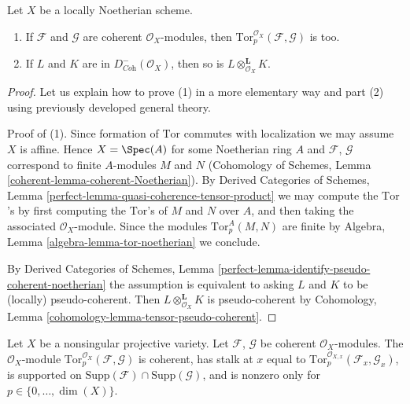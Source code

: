 \begin{lemma}
\label{lemma-tensor-coherent}
Let $X$ be a locally Noetherian scheme.
\begin{enumerate}
\item If $\mathcal{F}$ and $\mathcal{G}$ are coherent $\mathcal{O}_X$-modules,
then $\text{Tor}_p^{\mathcal{O}_X}(\mathcal{F}, \mathcal{G})$ is too.
\item If $L$ and $K$ are in $D^-_{\textit{Coh}}(\mathcal{O}_X)$, then
so is $L \otimes_{\mathcal{O}_X}^\mathbf{L} K$.
\end{enumerate}
\end{lemma}

\begin{proof}
Let us explain how to prove (1) in a more elementary way and part (2)
using previously developed general theory.

\medskip\noindent
Proof of (1). Since formation of $\text{Tor}$ commutes with localization
we may assume $X$ is affine. Hence $X = \Spec(A)$ for some Noetherian
ring $A$ and $\mathcal{F}$, $\mathcal{G}$ correspond to finite $A$-modules
$M$ and $N$ (Cohomology of Schemes, Lemma
\ref{coherent-lemma-coherent-Noetherian}).
By Derived Categories of Schemes, Lemma
\ref{perfect-lemma-quasi-coherence-tensor-product} we may
compute the $\text{Tor}$'s by first computing the $\text{Tor}$'s
of $M$ and $N$ over $A$, and then taking the associated $\mathcal{O}_X$-module.
Since the modules $\text{Tor}_p^A(M, N)$ are finite by
Algebra, Lemma \ref{algebra-lemma-tor-noetherian}
we conclude.

\medskip\noindent
By Derived Categories of Schemes, Lemma
\ref{perfect-lemma-identify-pseudo-coherent-noetherian}
the assumption is equivalent to asking $L$ and $K$ to be
(locally) pseudo-coherent. Then $L \otimes_{\mathcal{O}_X}^\mathbf{L} K$
is pseudo-coherent by
Cohomology, Lemma \ref{cohomology-lemma-tensor-pseudo-coherent}.
\end{proof}

\begin{lemma}
\label{lemma-compute-tor-nonsingular}
Let $X$ be a nonsingular projective variety.
Let $\mathcal{F}$, $\mathcal{G}$ be coherent $\mathcal{O}_X$-modules.
The $\mathcal{O}_X$-module
$\text{Tor}_p^{\mathcal{O}_X}(\mathcal{F}, \mathcal{G})$
is coherent, has stalk at $x$ equal to
$\text{Tor}_p^{\mathcal{O}_{X, x}}(\mathcal{F}_x, \mathcal{G}_x)$,
is supported on
$\text{Supp}(\mathcal{F}) \cap \text{Supp}(\mathcal{G})$, and
is nonzero only for $p \in \{0, \ldots, \dim(X)\}$.
\end{lemma}

